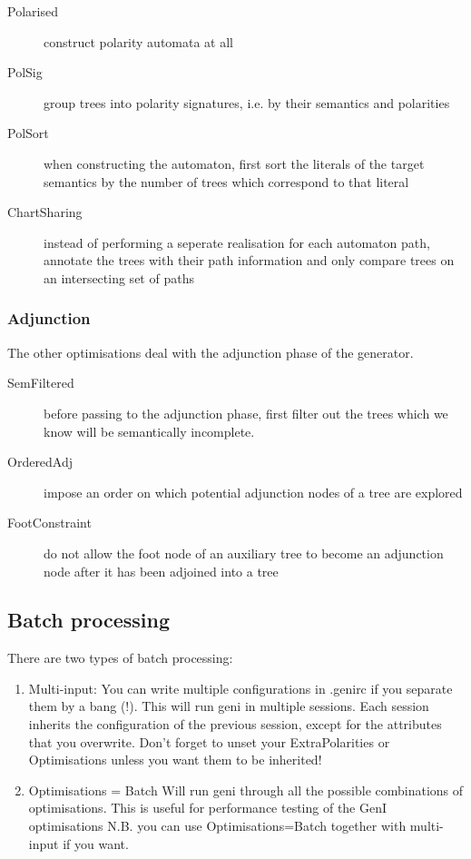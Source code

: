 \documentclass[11pt]{article}
\begin{document}
\begin{description}
\item[Polarised] construct polarity automata at all
\item[PolSig]    group trees into polarity signatures, i.e. by their
                 semantics and polarities
\item[PolSort]   when constructing the automaton, first sort the
                 literals of the target semantics by the number
                 of trees which correspond to that literal
\item[ChartSharing] instead of performing a seperate realisation
                    for each automaton path, annotate the trees
                    with their path information and only compare
                    trees on an intersecting set of paths
\end{description}

\subsubsection{Adjunction}

The other optimisations deal with the adjunction phase of the
generator.

\begin{description}
\item[SemFiltered] before passing to the adjunction phase,
                   first filter out the trees which we know
                   will be semantically incomplete.
\item[OrderedAdj] impose an order on which potential
                  adjunction nodes of a tree are explored
\item[FootConstraint] do not allow the foot node of an auxiliary tree to
                      become an adjunction node after it has been 
                      adjoined into a tree
\end{description}

\subsection{Batch processing}
There are two types of batch processing:
\begin{enumerate}
\item Multi-input:
      You can write multiple configurations in .genirc if you separate
      them by a bang (!).  This will run geni in multiple sessions.
      Each session inherits the configuration of the previous session,
      except for the attributes that you overwrite.  Don't forget to
      unset your ExtraPolarities or Optimisations unless you want them
      to be inherited!
\item Optimisations = Batch 
      Will run geni through all the possible combinations of
      optimisations.  This is useful for performance testing
      of the GenI optimisations
      N.B. you can use Optimisations=Batch together with multi-input
      if you want.
\end{enumerate}
\end{document}
